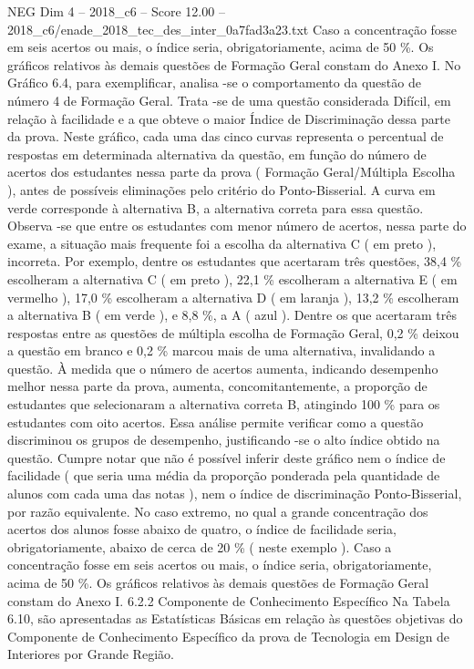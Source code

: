 \begin{textsample}{NEG Dim 4 – 2018\_c6 – Score 12.00 – 2018\_c6/enade\_2018\_tec\_des\_inter\_0a7fad3a23.txt}
Caso a concentração fosse em seis acertos ou mais, o índice seria, obrigatoriamente, acima de 50 \%.
Os gráficos relativos às demais questões de Formação Geral constam do Anexo I.
No Gráfico 6.4, para exemplificar, analisa -se o comportamento da questão de número 4 de Formação Geral.
Trata -se de uma questão considerada Difícil, em relação à facilidade e a que obteve o maior Índice de Discriminação dessa parte da prova.
Neste gráfico, cada uma das cinco curvas representa o percentual de respostas em determinada alternativa da questão, em função do número de acertos dos estudantes nessa parte da prova ( Formação Geral/Múltipla Escolha ), antes de possíveis eliminações pelo critério do Ponto-Bisserial.
A curva em verde corresponde à alternativa B, a alternativa correta para essa questão.
Observa -se que entre os estudantes com menor número de acertos, nessa parte do exame, a situação mais frequente foi a escolha da alternativa C ( em preto ), incorreta.
Por exemplo, dentre os estudantes que acertaram três questões, 38,4 \% escolheram a alternativa C ( em preto ), 22,1 \% escolheram a alternativa E ( em vermelho ), 17,0 \% escolheram a alternativa D ( em laranja ), 13,2 \% escolheram a alternativa B ( em verde ), e 8,8 \%, a A ( azul ).
Dentre os que acertaram três respostas entre as questões de múltipla escolha de Formação Geral, 0,2 \% deixou a questão em branco e 0,2 \% marcou mais de uma alternativa, invalidando a questão.
À medida que o número de acertos aumenta, indicando desempenho melhor nessa parte da prova, aumenta, concomitantemente, a proporção de estudantes que selecionaram a alternativa correta B, atingindo 100 \% para os estudantes com oito acertos.
Essa análise permite verificar como a questão discriminou os grupos de desempenho, justificando -se o alto índice obtido na questão.
Cumpre notar que não é possível inferir deste gráfico nem o índice de facilidade ( que seria uma média da proporção ponderada pela quantidade de alunos com cada uma das notas ), nem o índice de discriminação Ponto-Bisserial, por razão equivalente.
No caso extremo, no qual a grande concentração dos acertos dos alunos fosse abaixo de quatro, o índice de facilidade seria, obrigatoriamente, abaixo de cerca de 20 \% ( neste exemplo ).
Caso a concentração fosse em seis acertos ou mais, o índice seria, obrigatoriamente, acima de 50 \%.
Os gráficos relativos às demais questões de Formação Geral constam do Anexo I. 6.2.2 Componente de Conhecimento Específico Na Tabela 6.10, são apresentadas as Estatísticas Básicas em relação às questões objetivas do Componente de Conhecimento Específico da prova de Tecnologia em Design de Interiores por Grande Região.

\end{textsample}
